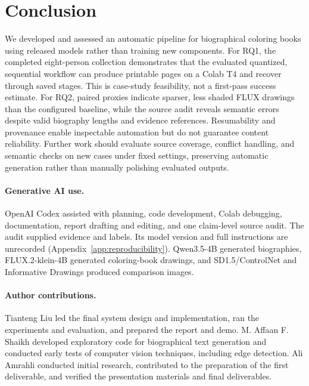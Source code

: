 \documentclass[11pt]{article}
\begin{document}
\section{Conclusion}
\label{sec:conclusion}

We developed and assessed an automatic pipeline for biographical coloring books using released models rather than training new components. For RQ1, the completed eight-person collection demonstrates that the evaluated quantized, sequential workflow can produce printable pages on a Colab T4 and recover through saved stages. This is case-study feasibility, not a first-pass success estimate. For RQ2, paired proxies indicate sparser, less shaded FLUX drawings than the configured baseline, while the source audit reveals semantic errors despite valid biography lengths and evidence references. Resumability and provenance enable inspectable automation but do not guarantee content reliability. Further work should evaluate source coverage, conflict handling, and semantic checks on new cases under fixed settings, preserving automatic generation rather than manually polishing evaluated outputs.

\paragraph{Generative AI use.}
OpenAI Codex assisted with planning, code development, Colab debugging, documentation, report drafting and editing, and one claim-level source audit. The audit supplied evidence and labels. Its model version and full instructions are unrecorded (Appendix~\ref{app:reproducibility}). Qwen3.5-4B generated biographies, FLUX.2-klein-4B generated coloring-book drawings, and SD1.5/ControlNet and Informative Drawings produced comparison images.

\paragraph{Author contributions.}
Tianteng Liu led the final system design and implementation, ran the experiments and evaluation, and prepared the report and demo. M. Affaan F. Shaikh developed exploratory code for biographical text generation and conducted early tests of computer vision techniques, including edge detection. Ali Amrahli conducted initial research, contributed to the preparation of the first deliverable, and verified the presentation materials and final deliverables.

\clearpage

\clearpage
\appendix


\end{document}
